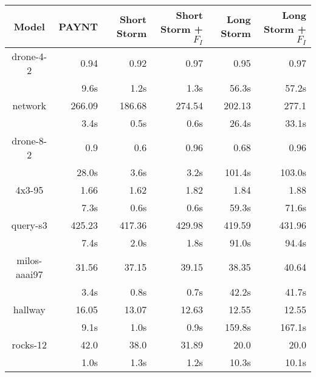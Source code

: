 \documentclass{article}
\begin{document}
\begin{table}
\begin{tabular}{|c|r|r|r|r|r|}
\hline

Model & PAYNT & Short Storm & Short Storm + $F_{I}$ & Long Storm & Long Storm + $F_{I}$ \\ \hline 

drone-4-2 & 0.94 & 0.92 & 0.97 & 0.95 & 0.97 \\ 
 & 9.6s & 1.2s & 1.3s & 56.3s & 57.2s \\ 
\hline
network & 266.09 & 186.68 & 274.54 & 202.13 & 277.1 \\ 
 & 3.4s & 0.5s & 0.6s & 26.4s & 33.1s \\ 
\hline
drone-8-2 & 0.9 & 0.6 & 0.96 & 0.68 & 0.96 \\ 
 & 28.0s & 3.6s & 3.2s & 101.4s & 103.0s \\ 
\hline
4x3-95 & 1.66 & 1.62 & 1.82 & 1.84 & 1.88 \\ 
 & 7.3s & 0.6s & 0.6s & 59.3s & 71.6s \\ 
\hline
query-s3 & 425.23 & 417.36 & 429.98 & 419.59 & 431.96 \\ 
 & 7.4s & 2.0s & 1.8s & 91.0s & 94.4s \\ 
\hline
milos-aaai97 & 31.56 & 37.15 & 39.15 & 38.35 & 40.64 \\ 
 & 3.4s & 0.8s & 0.7s & 42.2s & 41.7s \\ 
\hline
hallway & 16.05 & 13.07 & 12.63 & 12.55 & 12.55 \\ 
 & 9.1s & 1.0s & 0.9s & 159.8s & 167.1s \\ 
\hline
rocks-12 & 42.0 & 38.0 & 31.89 & 20.0 & 20.0 \\ 
 & 1.0s & 1.3s & 1.2s & 10.3s & 10.1s \\ 
\hline

\end{tabular}
\end{table}
\end{document}
